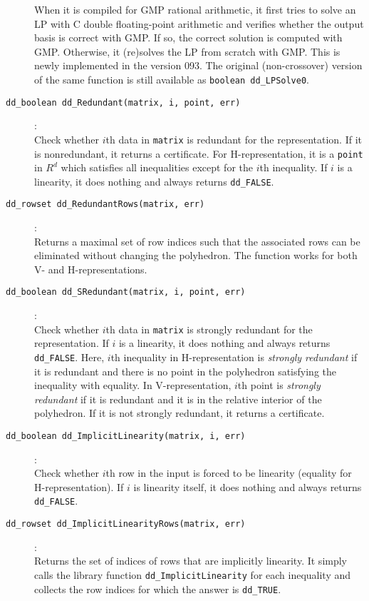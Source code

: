 \documentclass[11pt]{article}
\newcommand {\0} {{\bf 0}}
\begin{document}
\begin{description}
When it is compiled for GMP rational
arithmetic, it first tries to solve an LP with C  double
floating-point arithmetic and verifies whether the output
basis is correct with GMP.  If so, the correct solution is
computed with GMP.  Otherwise, it (re)solves the LP
from scratch with GMP.   This is newly implemented
in the version 093.  The original (non-crossover) version of
the same function is still  available as {\tt boolean dd\_LPSolve0}.

\item[{\tt dd\_boolean dd\_Redundant(matrix, i, point, err)}]:\\
Check whether $i$th data in {\tt matrix} is redundant for the representation.
If it is nonredundant, it returns a certificate.  For H-representation,
it is a {\tt point} in $R^d$ which satisfies
all inequalities except for the $i$th inequality.  If $i$ is a linearity,
it does nothing and always returns {\tt dd\_FALSE}.

\item[{\tt dd\_rowset dd\_RedundantRows(matrix, err)}]:\\
Returns a maximal set of row indices such that the associated rows
can be eliminated without changing the polyhedron.
The function works for both V- and H-representations.

\item[{\tt dd\_boolean dd\_SRedundant(matrix, i, point, err)}]:\\
Check whether $i$th data in {\tt matrix} is strongly redundant for the representation.
If $i$ is a linearity, it does nothing and always returns {\tt dd\_FALSE}.
Here,  $i$th inequality in H-representation is {\em strongly redundant\/} if it is redundant
and there is no point in the polyhedron satisfying the inequality with equality.
In V-representation,  $i$th point is {\em strongly redundant\/} if it is redundant
and it is in the relative interior of the polyhedron. If it is not strongly redundant, it returns a certificate.

\item[{\tt dd\_boolean dd\_ImplicitLinearity(matrix, i, err)}]:\\
Check whether $i$th row
in the input is forced to be linearity (equality
for H-representation).
If $i$ is linearity itself,
it does nothing and always returns {\tt dd\_FALSE}.

\item[{\tt dd\_rowset dd\_ImplicitLinearityRows(matrix, err)}]:\\
Returns the set of indices of rows that are
implicitly linearity.  It simply calls the library function
{\tt dd\_ImplicitLinearity} for each inequality and collects
the row indices for which the answer is {\tt dd\_TRUE}.


\end{description}
\end{document}
